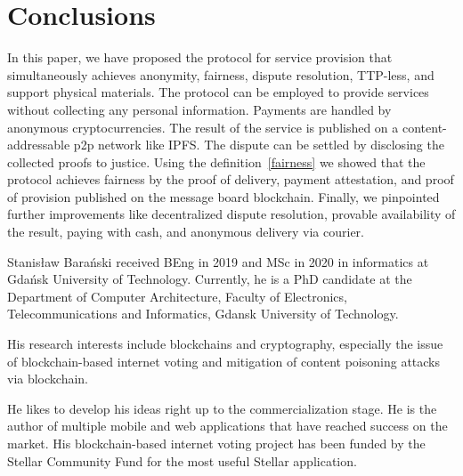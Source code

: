 \documentclass{ieeeaccess}
\begin{document}
\section{Conclusions}\label{sec:conclusion}
In this paper, we have proposed the protocol for service provision that simultaneously achieves anonymity, fairness, dispute resolution, TTP-less, and support physical materials. The protocol can be employed to provide services without collecting any personal information. Payments are handled by anonymous cryptocurrencies. The result of the service is published on a content-addressable p2p network like IPFS. The dispute can be settled by disclosing the collected proofs to justice. 
Using the definition~\ref{fairness} we showed that the protocol achieves fairness by the proof of delivery, payment attestation, and proof of provision published on the message board blockchain. Finally, we pinpointed further improvements like decentralized dispute resolution, provable availability of the result, paying with cash, and anonymous delivery via courier.



\EOD



\begin{IEEEbiography}{Stanis\l{}aw Bara{\'n}ski} received BEng in 2019 and MSc in 2020 in informatics at Gdańsk University of Technology. 
Currently, he is a PhD candidate at the Department of Computer Architecture, Faculty of Electronics, Telecommunications and Informatics, Gdansk University of Technology.

His research interests include blockchains and cryptography, especially the issue of blockchain-based internet voting and mitigation of content poisoning attacks via blockchain.

He likes to develop his ideas right up to the commercialization stage. He is the author of multiple mobile and web applications that have reached success on the market. His blockchain-based internet voting project has been funded by the Stellar Community Fund for the most useful Stellar application. 
\end{IEEEbiography}
\end{document}
